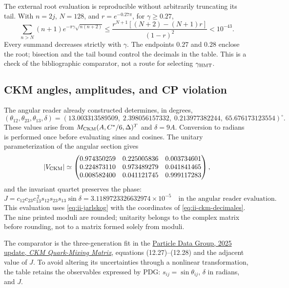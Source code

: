 The external root evaluation is reproducible without arbitrarily
truncating its tail. With \(n=2j\), \(N=128\), and
\(r=e^{-0.27\pi}\), for \(\gamma\geq0.27\),
\[
 \sum_{n>N}(n+1)e^{-\pi\gamma\sqrt{n(n+2)}}
 \leq \frac{r^{N+1}[(N+2)-(N+1)r]}{(1-r)^2}<10^{-43}.
\]
Every summand decreases strictly with \(\gamma\). The endpoints
\(0.27\) and \(0.28\) enclose the root; bisection and the tail bound
control the decimals in the table. This is a check of the
bibliographic comparator, not a route for selecting \(\gamma_{\rm HMT}\).

\subsection{CKM angles, amplitudes, and CP violation}

The angular reader already constructed determines, in degrees,
\begin{equation}
 (\theta_{12},\theta_{23},\theta_{13},\delta)
 =(13.003313589509,\;2.398056157332,\;
 0.213977382244,\;65.676173123554)^\circ.
 \label{eq:ii-ckm-decimales}
\end{equation}
These values arise from \(M_{\rm CKM}(A,C^*/6,\Delta)^T\) and
\(\delta=9A\). Conversion to radians is performed once before
evaluating sines and cosines. The unitary parameterization of the angular
section gives
\[
 |V_{\rm CKM}|\simeq
 \begin{pmatrix}
 0.974350259&0.225005836&0.003734601\\
 0.224873110&0.973489279&0.041841465\\
 0.008582400&0.041121745&0.999117283
 \end{pmatrix},
\]
and the invariant quartet preserves the phase:
\[
 J=c_{12}c_{23}c_{13}^{\,2}s_{12}s_{23}s_{13}\sin\delta
 =3.1189723326632974\times10^{-5}\quad
 \text{in the angular reader evaluation.}
\]
This evaluation uses \eqref{eq:ii-jarlskog} with the coordinates of
\eqref{eq:ii-ckm-decimales}. The nine printed moduli are rounded; unitarity belongs
to the complex matrix before rounding, not to a matrix formed
solely from moduli.

The comparator is the three-generation fit in the
\href{https://pdg.lbl.gov/2025/reviews/rpp2025-rev-ckm-matrix.pdf}
{Particle Data Group, 2025 update, \emph{CKM Quark-Mixing Matrix}},
equations (12.27)--(12.28) and the adjacent value of \(J\). To avoid
altering its uncertainties through a nonlinear transformation, the table
retains the observables expressed by PDG: \(s_{ij}=\sin\theta_{ij}\),
\(\delta\) in radians, and \(J\).

